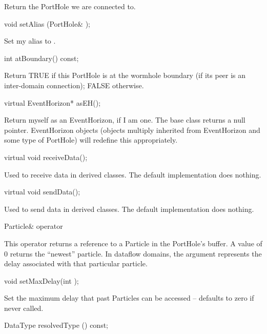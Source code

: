 Return the PortHole we are connected to.

\begin{example}
void setAlias (PortHole& );
\end{example}

Set my alias to .

\begin{example}
int atBoundary() const;
\end{example}

Return TRUE if this PortHole is at the wormhole boundary (if its peer is
an inter-domain connection); FALSE otherwise.

\begin{example}
virtual EventHorizon* asEH();
\end{example}

Return myself as an EventHorizon, if I am one.  The base class returns
a null pointer.  EventHorizon objects (objects multiply inherited from
EventHorizon and some type of PortHole) will redefine this
appropriately.

\begin{example}
virtual void receiveData();
\end{example}

Used to receive data in derived classes.  The default implementation
does nothing.

\begin{example}
virtual void sendData();
\end{example}

Used to send data in derived classes.  The default implementation
does nothing.

\begin{example}
Particle& operator %
\end{example}

This operator returns a reference to a Particle in the PortHole's
buffer.  A  value of 0 returns the ``newest'' particle.
In dataflow domains, the argument represents the delay associated
with that particular particle.

\begin{example}
void setMaxDelay(int );
\end{example}

Set the maximum delay that past Particles can be accessed -- defaults to
zero if never called.

\begin{example}
DataType resolvedType () const;
\end{example}

